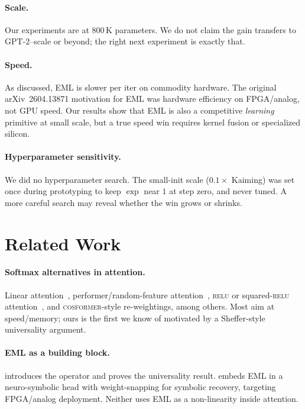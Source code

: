 \documentclass{article}
\begin{document}
\paragraph{Scale.} Our experiments are at $800$\,K parameters. We do not
claim the gain transfers to GPT-2--scale or beyond; the right next
experiment is exactly that.

\paragraph{Speed.} As discussed, EML is slower per iter on commodity
hardware. The original arXiv~2604.13871 motivation for EML was hardware
efficiency on FPGA/analog, not GPU speed. Our results show that EML is
also a competitive \emph{learning} primitive at small scale, but a true
speed win requires kernel fusion or specialized silicon.

\paragraph{Hyperparameter sensitivity.} We did no hyperparameter search.
The small-init scale ($0.1\times$ Kaiming) was set once during prototyping
to keep $\exp$ near $1$ at step zero, and never tuned. A more careful
search may reveal whether the win grows or shrinks.

\section{Related Work}

\paragraph{Softmax alternatives in attention.} Linear
attention~\citep{katharopoulos2020transformers},
performer/random-feature attention~\citep{choromanski2021performers},
\textsc{relu} or squared-\textsc{relu}
attention~\citep{wortsman2023replacing}, and \textsc{cosformer}-style
re-weightings, among others. Most aim at speed/memory; ours is the first
we know of motivated by a Sheffer-style universality argument.

\paragraph{EML as a building block.}
\citet{odrzywolek2026eml} introduces the operator and proves the
universality result. \citet{odrzywolek2026hardware} embeds EML in a
neuro-symbolic head with weight-snapping for symbolic recovery, targeting
FPGA/analog deployment. Neither uses EML as a non-linearity inside
attention.
\end{document}
